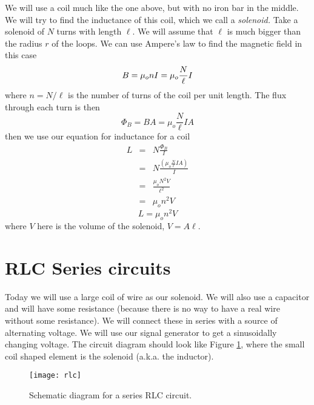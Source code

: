 We will use a coil much like the one above, but with no iron bar in the
middle. We will try to find the inductance of this coil,
which we call a \emph{%
solenoid.} Take a solenoid of $N$ turns with length $\ell .$ We will assume
that $\ell $ is much bigger than the radius $r$ of the loops. We can use
Ampere's law to find the magnetic field in this case 
\begin{equation*}
B =\mu _{o}nI \\
=\mu _{o}\frac{N}{\ell }I
\end{equation*}%
where $n=N/\ell $ is the number of turns of the coil per unit length. The
flux through each turn is then 
\begin{equation*}
\Phi _{B}=BA=\mu _{o}\frac{N}{\ell }IA
\end{equation*}%
then we use our equation for inductance for a coil%
\begin{eqnarray*}
L &=&N\frac{\Phi _{B}}{I} \\
&=&N\frac{\left( \mu _{o}\frac{N}{\ell }IA\right) }{I} \\
&=&\frac{\mu _{o}N^{2}V}{\ell ^{2}} \\
&=&\mu _{o}n^{2}V
\end{eqnarray*}%
\begin{equation}
L=\mu _{o}n^{2}V  \label{Solenoid Inductance}
\end{equation}%
where $V$ here is the volume of the solenoid, $V=A\ell .$

\section{RLC Series circuits}

Today we will use a large coil of wire as our solenoid. We will also
use a capacitor and will have some resistance (because there is no way to
have a real wire without some resistance). We will connect these in series with
a source of alternating voltage. We will use our signal generator to get a
sinusoidally changing voltage. The circuit diagram should look like
Figure \ref{fig:rlc},
where the small coil shaped element is the solenoid (a.k.a. the inductor).
\begin{figure}[htbp!]
	\centering
\texttt{[image: rlc]}
	\caption{Schematic diagram for a series RLC circuit.}
	\label{fig:rlc}
\end{figure}%

